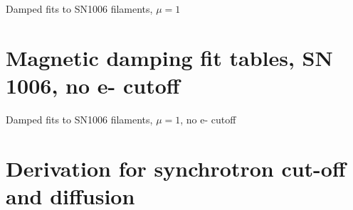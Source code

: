 \documentclass[iop, apj, numberedappendix]{emulateapj}
\newcommand*{\Chandra}{\textit{Chandra}\ }
\begin{document}
{    \begin{table*}[ht]
        \scriptsize
        \centering
        \caption{Damped fits to SN1006 filaments, $\mu = 1$}
        
    \end{table*}

    \clearpage
    \section{Magnetic damping fit tables, SN 1006, no e- cutoff}

    \begin{table*}[ht]
        \scriptsize
        \centering
        \caption{Damped fits to SN1006 filaments, $\mu = 1$, no e- cutoff}
        
    \end{table*}
}



%


\clearpage
\section{Derivation for synchrotron cut-off and diffusion}

\end{document}
